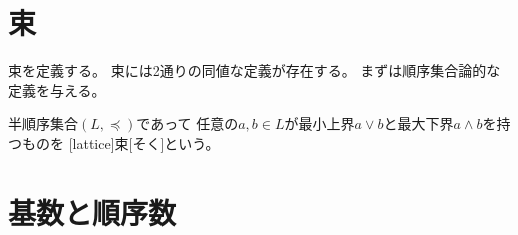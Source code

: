 \documentclass[report]{jlreq}
\begin{document}
\section{束}

束を定義する。
束には2通りの同値な定義が存在する。
まずは順序集合論的な定義を与える。

\begin{definition}[束 (順序集合論的な定義)]
    半順序集合$(L, \preceq)$であって
    任意の$a, b \in L$が最小上界$a \vee b$と最大下界$a \wedge b$を持つものを
    [lattice]{束}[そく]という。
\end{definition}

\begin{definition}[束 (代数的な定義)]
    \TODO{}
\end{definition}

%
\section{基数と順序数}

\TODO{}
\end{document}
